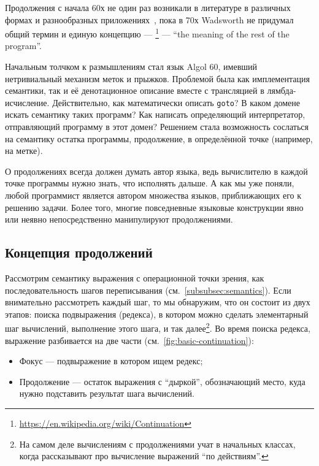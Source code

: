 
Продолжения с начала 60х не один раз возникали в литературе в различных формах и разнообразных приложениях~\cite{reynolds1993discoveries, landin1997histories}, пока в 70х Wadsworth не придумал общий термин и единую концепцию --- \footnote{\url{https://en.wikipedia.org/wiki/Continuation}} --- ``the meaning of the rest of the program''.

Начальным толчком к размышлениям стал язык Algol 60, имевший нетривиальный механизм меток и прыжков.
Проблемой была как имплементация семантики, так и её денотационное описание вместе с трансляцией в лямбда-исчисление.
Действительно, как математически описать \texttt{goto}?
В каком домене искать семантику таких программ?
Как написать определяющий интерпретатор, отправляющий программу в этот домен?
Решением стала возможность сослаться на семантику остатка программы, продолжение, в определённой точке (например, на метке).

О продолжениях всегда должен думать автор языка, ведь вычислителю в каждой точке программы нужно знать, что исполнять дальше.
А как мы уже поняли, любой программист является автором множества языков, приближающих его к решению задачи.
Более того, многие повседневные языковые конструкции явно или неявно непосредственно манипулируют продолжениями.

\subsection{Концепция продолжений}

Рассмотрим семантику выражения с операционной точки зрения, как последовательность шагов переписывания (см.\ \ref{subsubsec:semantics}).
Если внимательно рассмотреть каждый шаг, то мы обнаружим, что он состоит из двух этапов: поиска подвыражения (редекса), в котором можно сделать элементарный шаг вычислений, выполнение этого шага, и так далее\footnote{На самом деле вычислениям с продолжениями учат в начальных классах, когда рассказывают про вычисление выражений ``по действиям''.}.
Во время поиска редекса, выражение разбивается на две части (см.~\ref{fig:basic-continuation}):
\begin{itemize}
    \item Фокус --- подвыражение в котором ищем редекс;
    \item Продолжение --- остаток выражения с ``дыркой'', обозначающий место, куда нужно подставить результат шага вычислений.
\end{itemize}

